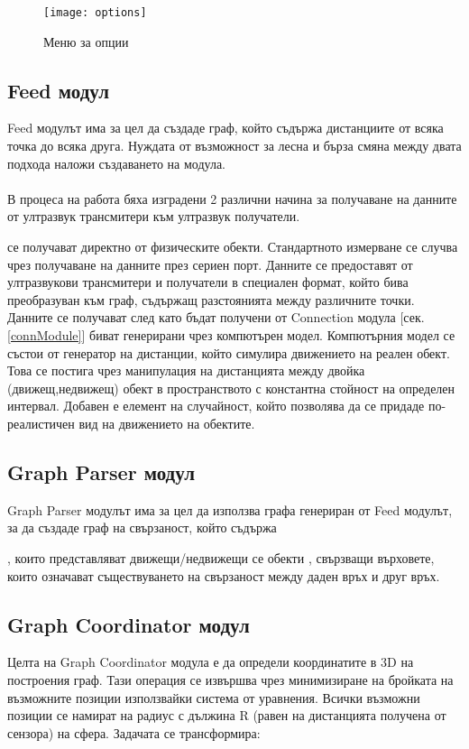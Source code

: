 \begin{figure}
   \centerline{\texttt{[image: options]}}
    \caption{Меню за опции}
    \label{fig:options}
\end{figure}

\pagebreak

\subsection{Feed модул}
Feed модулът има за цел да създаде граф, който съдържа дистанциите от всяка точка до всяка друга. Нуждата от възможност за лесна и бърза смяна между двата подхода наложи създаването на модула.\\\\
В процеса на работа бяха изградени 2 различни начина за получаване на данните от ултразвук трансмитери към ултразвук получатели. 
\begin{enumerate}
     се получават директно от физическите обекти. Стандартното измерване се случва чрез получаване на данните през сериен порт. Данните се предоставят от ултразвукови трансмитери и получатели в специален формат, който бива преобразуван към граф, съдържащ разстоянията между различните точки. Данните се получават след като бъдат получени от Connection модула [сек. \ref{connModule}]
     биват генерирани чрез компютърен модел. Компютърния модел се състои от генератор на дистанции, който симулира движението на реален обект. Това се постига чрез манипулация на дистанцията между двойка (движещ,недвижещ) обект в пространството с константна стойност на определен интервал. Добавен е елемент на случайност, който позволява да се придаде по-реалистичен вид на движението на обектите.
\end{enumerate}

\pagebreak

\subsection{Graph Parser модул}
Graph Parser модулът има за цел да използва графа генериран от Feed модулът, за да създаде граф на свързаност, който съдържа
\begin{enumerate}
, които представляват движещи/недвижещи се обекти 
, свързващи върховете, които означават съществуването на свързаност между
даден връх и друг връх.
\end{enumerate}

\pagebreak

\subsection{Graph Coordinator модул}
Целта на Graph Coordinator модула е да определи координатите в 3D на построения граф. Тази операция се извършва чрез минимизиране на бройката на възможните позиции използвайки система от уравнения. Всички възможни позиции се намират на радиус с дължина R (равен на дистанцията получена от сензора) на сфера. Задачата се трансформира:\\

